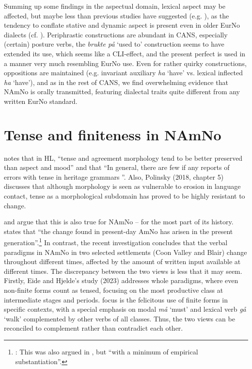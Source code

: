 \documentclass[output=paper]{langscibook}
\begin{document}
Summing up some findings in the aspectual domain, lexical aspect may be affected, but maybe less than previous studies have suggested (e.g. \citealt{Kühl2018}), as the tendency to conflate stative and dynamic aspect is present even in older EurNo dialects (cf. \citealt{EikLaanemets2021}). Periphrastic constructions are abundant in CANS, especially (certain) posture verbs, the \textit{brukte på} ‘used to’ construction seems to have extended its use, which seems like a CLI-effect, and the present perfect is used in a manner very much resembling EurNo use. Even for rather quirky constructions, oppositions are maintained (e.g. invariant auxiliary \textit{ha} ‘have’ vs. lexical inflected \textit{ha} ‘have’), and as in the rest of CANS, we find overwhelming evidence that NAmNo is orally transmitted, featuring dialectal traits quite different from any written EurNo standard.  

\section{Tense and finiteness in NAmNo}
\label{sec:eide:5}

\citet[62]{Montrul2016} notes that in HL, “tense and agreement morphology tend to be better preserved than aspect and mood” and that “In general, there are few if any reports of errors with tense in heritage grammars \citep{Fenyvesi2000}”. Also, Polinsky (2018, chapter 5) discusses that although morphology is seen as vulnerable to erosion in language contact, tense as a morphological subdomain has proved to be highly resistant to change. 

\citet{Lykke2020, Lykke2022} and \citet{NatvigEtAl2023} argue that this is also true for NAmNo – for the most part of its history. \citet[78]{Lykke2022} states that “the change found in present-day AmNo has arisen in the present generation”.\footnote{\citet[78]{Lykke2022}: This was also argued in \citet{Lykke2020}, but “with a minimum of empirical substantiation”.}  In contrast, the recent investigation \citet{EideHjelde2023} concludes that the verbal paradigms in NAmNo in two selected settlements (Coon Valley and Blair) change throughout different times, affected by the amount of written input available at different times. The discrepancy between the two views is less that it may seem. Firstly, Eide and Hjelde’s study (2023) addresses whole paradigms, where even non-finite forms count as tensed, focusing on the most productive class at intermediate stages and periods.  focus is the felicitous use of finite forms in specific contexts, with a special emphasis on modal \textit{må} ‘must’ and lexical verb \textit{gå} ‘walk’ complemented by other verbs of all classes. Thus, the two views can be reconciled to complement rather than contradict each other.\largerpage
\end{document}
